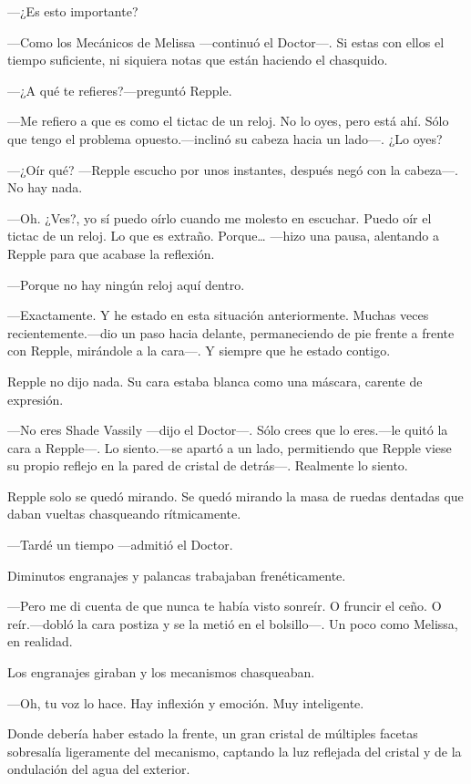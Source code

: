 {---¿Es esto importante?}

{---Como los Mecánicos de Melissa ---continuó el Doctor---. Si estas con
	ellos el tiempo suficiente, ni siquiera notas que están haciendo el
chasquido.}

{---¿A qué te refieres?---preguntó Repple.}

{---Me refiero a que es como el tictac de un reloj. No lo oyes, pero
	está ahí. Sólo que tengo el problema opuesto.---inclinó su cabeza hacia
un lado---. ¿Lo oyes?}

{---¿Oír qué? ---Repple escucho por unos instantes, después negó con la
cabeza---. No hay nada.}

{---Oh. ¿Ves?, yo sí puedo oírlo cuando me molesto en escuchar. Puedo
	oír el tictac de un reloj. Lo que es extraño. Porque\ldots{} ---hizo una
pausa, alentando a Repple para que acabase la reflexión.}

{---Porque no hay ningún reloj aquí dentro.}

{---Exactamente. Y he estado en esta situación anteriormente. Muchas
	veces recientemente.---dio un paso hacia delante, permaneciendo de pie
	frente a frente con Repple, mirándole a la cara---. Y siempre que he
estado contigo.}

{Repple no dijo nada. Su cara estaba blanca como una máscara, carente de
expresión.}

{---No eres Shade Vassily ---dijo el Doctor---. Sólo crees que lo
	eres.---le quitó la cara a Repple---. Lo siento.---se apartó a un lado,
	permitiendo que Repple viese su propio reflejo en la pared de cristal de
detrás---. Realmente lo siento.}

{Repple solo se quedó mirando. Se quedó mirando la masa de ruedas
dentadas que daban vueltas chasqueando rítmicamente.}

{---Tardé un tiempo ---admitió el Doctor.}

{Diminutos engranajes y palancas trabajaban frenéticamente.}

{---Pero me di cuenta de que nunca te había visto sonreír. O fruncir el
	ceño. O reír.---dobló la cara postiza y se la metió en el bolsillo---.
Un poco como Melissa, en realidad.}

{Los engranajes giraban y los mecanismos chasqueaban.}

{---Oh, tu voz lo hace. Hay inflexión y emoción. Muy inteligente.}

{Donde debería haber estado la frente, un gran cristal de múltiples
	facetas sobresalía ligeramente del mecanismo, captando la luz reflejada
del cristal y de la ondulación del agua del exterior.}

